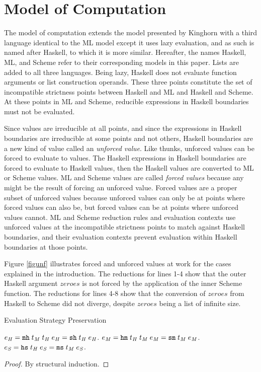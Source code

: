 \section{Model of Computation}

The model of computation extends the model presented by Kinghorn \cite{kinghorn07} with a third language identical to the ML model except it uses lazy evaluation, and as such is named after Haskell, to which it is more similar. Hereafter, the names Haskell, ML, and Scheme refer to their corresponding models in this paper. Lists are added to all three languages. Being lazy, Haskell does not evaluate function arguments or list construction operands. These three points constitute the set of incompatible strictness points between Haskell and ML and Haskell and Scheme. At these points in ML and Scheme, reducible expressions in Haskell boundaries must not be evaluated.

Since values are irreducible at all points, and since the expressions in Haskell boundaries are irreducible at some points and not others, Haskell boundaries are a new kind of value called an \emph{unforced value}. Like thunks, unforced values can be forced to evaluate to values. The Haskell expressions in Haskell boundaries are forced to evaluate to Haskell values, then the Haskell values are converted to ML or Scheme values. ML and Scheme values are called \emph{forced values} because any might be the result of forcing an unforced value. Forced values are a proper subset of unforced values because unforced values can only be at points where forced values can also be, but forced values can be at points where unforced values cannot. ML and Scheme reduction rules and evaluation contexts use unforced values at the incompatible strictness points to match against Haskell boundaries, and their evaluation contexts prevent evaluation within Haskell boundaries at those points.

Figure \ref{figunf} illustrates forced and unforced values at work for the cases explained in the introduction. The reductions for lines 1-4 show that the outer Haskell argument $zeroes$ is not forced by the application of the inner Scheme function. The reductions for lines 4-8 show that the conversion of $zeroes$ from Haskell to Scheme did not diverge, despite $zeroes$ being a list of infinite size.



\begin{theorem}{Evaluation Strategy Preservation}

\label{thmstr}
$e_{\mathit{H}} = \mathtt{mh} \; t_{\mathit{M}} \; t_{\mathit{H}} \; e_{\mathit{H}} = \mathtt{sh} \; t_{\mathit{H}} \; e_{\mathit{H}}$.
$e_{\mathit{M}} = \mathtt{hm} \; t_{\mathit{H}} \; t_{\mathit{M}} \; e_{\mathit{M}} = \mathtt{sm} \; t_{\mathit{M}} \; e_{\mathit{M}}$.
$e_{\mathit{S}} = \mathtt{hs} \; t_{\mathit{H}} \; e_{\mathit{S}} = \mathtt{ms} \; t_{\mathit{M}} \; e_{\mathit{S}}$.
\begin{proof}
By structural induction.
\end{proof}
\end{theorem}

